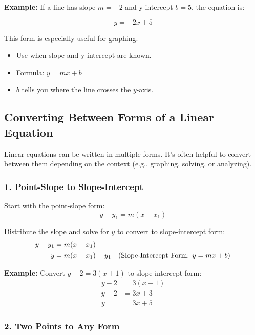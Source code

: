 \documentclass[11pt]{article}
\begin{document}
\textbf{Example:}
If a line has slope \( m = -2 \) and y-intercept \( b = 5 \), the equation is:

\[
y = -2x + 5
\]

This form is especially useful for graphing.

\begin{tcolorbox}[colback=orange!5!white, colframe=orange!80!black, title=Slope-Intercept Summary]
\begin{itemize}
  \item Use when slope and y-intercept are known.
  \item Formula: \( y = mx + b \)
  \item \( b \) tells you where the line crosses the \( y \)-axis.
\end{itemize}
\end{tcolorbox}
\subsection{Converting Between Forms of a Linear Equation}

Linear equations can be written in multiple forms. It’s often helpful to convert between them depending on the context (e.g., graphing, solving, or analyzing).

\subsubsection*{1. Point-Slope to Slope-Intercept}

Start with the point-slope form:
\[
y - y_1 = m(x - x_1)
\]

Distribute the slope and solve for \( y \) to convert to slope-intercept form:
\[
\begin{align*}
y - y_1 &= m(x - x_1) \\
y &= m(x - x_1) + y_1 \quad \text{(Slope-Intercept Form: \( y = mx + b \))}
\end{align*}
\]

\textbf{Example:}
Convert \( y - 2 = 3(x + 1) \) to slope-intercept form:
\[
\begin{align*}
y - 2 &= 3(x + 1) \\
y - 2 &= 3x + 3 \\
y &= 3x + 5
\end{align*}
\]

\subsubsection*{2. Two Points to Any Form}
\end{document}
